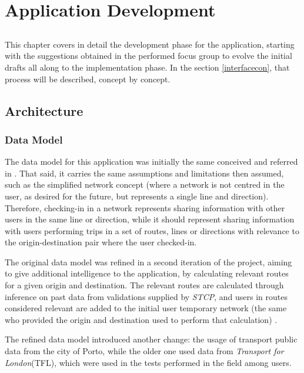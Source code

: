 \chapter{Application Development} \label{chap:chap5}

\section*{}

This chapter covers in detail the development phase for the application, starting with the suggestions obtained in the performed focus group to evolve the initial drafts all along to the implementation phase. In the section \ref{interfacecon}, that process will be described, concept by concept.

\section{Architecture}

\subsection{Data Model}

The data model for this application was initially the same conceived and referred in \cite{kn:eSG12}. That said, it carries the same assumptions and limitations then assumed, such as the simplified network concept (where a network is not centred in the user, as desired for the future, but represents a single line and direction).
Therefore, checking-in in a network represents sharing information with other users in the same line or direction, while it should represent sharing information with users performing trips in a set of routes, lines or directions with relevance to the origin-destination pair where the user checked-in.

The original data model was refined in a second iteration of the project, aiming to give additional intelligence to the application, by calculating relevant routes for a given origin and destination. The relevant routes are calculated through inference on past data from validations supplied by \emph{STCP}, and users in routes considered relevant are added to the initial user temporary network (the same who provided the origin and destination used to perform that calculation) \cite{kn:Dia13}.

The refined data model introduced another change: the usage of transport public data from the city of Porto, while the older one used data from \emph{Transport for London}(TFL), which were used in the tests performed in the field among users. 

